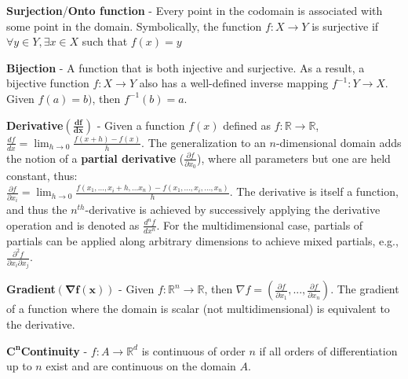 \begin{defn}
  \textbf{Surjection}/\textbf{Onto function} - Every point in the codomain is
  associated with some point in the domain. Symbolically, the function
  $f:X \rightarrow Y$ is surjective if $\forall y \in Y,\exists x \in X$ such that $f(x)=y$
\end{defn}

\begin{defn}
  \textbf{Bijection} - A function that is both injective and surjective. As a
  result, a bijective function $f: X \rightarrow Y$ also has a well-defined inverse mapping
  $f^{-1} : Y \rightarrow X$. Given $f(a) = b)$, then $f^{-1}(b) = a$.
\end{defn}

\begin{defn}
\textbf{Derivative}$\mathbf{(\frac{df}{dx})}$ - Given a function $f(x)$ defined
 as $f : \mathbb{R} \rightarrow \mathbb{R}$, \\
 $\frac{df}{dx} = \lim_{h\rightarrow 0}\frac{f(x+h)-f(x)}{h}$.
 The generalization to an $n$-dimensional domain adds the notion of a \textbf{partial derivative} ($\frac{\partial f}{\partial x_0}$), where all parameters but one are held constant, thus:\\
 $\frac{\partial f}{\partial x_i} = \lim_{h\rightarrow 0}\frac{f(x_1,...,x_i+h,...x_n)-f(x_1,...,x_i,...,x_n)}{h}$.
 The derivative is itself a function, and thus the $n^{th}$-derivative is achieved by successively applying the derivative operation and is denoted as $\frac{d^nf}{dx^n}$.
 For the multidimensional case, partials of partials can be applied along arbitrary dimensions to achieve mixed partials, e.g., $\frac{\partial^2 f}{\partial x_i \partial x_j}$.
\end{defn}

\begin{defn}
  \textbf{Gradient}$\mathbf{(\nabla f(\mathbf{x}))}$ - Given $f : \mathbb{R}^n \rightarrow \mathbb{R}$, then $\nabla f = \left(\frac{\partial f}{\partial
  x_1},...,\frac{\partial f}{\partial x_{n}}\right)$.
  The gradient of a function where the domain is scalar (not multidimensional) is equivalent to the derivative.
\end{defn}

\begin{defn}
  $\mathbf{C^n}$\textbf{Continuity} - $f : A \rightarrow \mathbb{R}^d$ is continuous of order $n$ if all orders of differentiation up to $n$ exist and are continuous on the domain $A$.
\end{defn}

